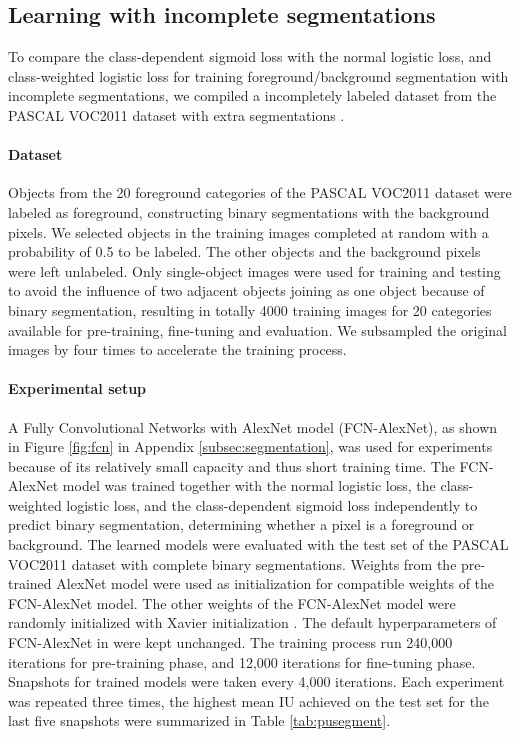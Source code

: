 \subsection{Learning with incomplete segmentations}
To compare the class-dependent sigmoid loss with the normal logistic loss, and class-weighted logistic loss for training foreground/background segmentation with incomplete segmentations, we compiled a incompletely labeled dataset from the PASCAL VOC2011 dataset \cite{everingham2015pascal} with extra segmentations \cite{hariharan2011semantic}.

\paragraph{Dataset}
Objects from the 20 foreground categories of the PASCAL VOC2011 dataset were labeled as foreground, constructing binary segmentations with the background pixels.
We selected objects in the training images completed at random with a probability of 0.5 to be labeled.
The other objects and the background pixels were left unlabeled.
Only single-object images were used for training and testing to avoid the influence of two adjacent objects joining as one object because of binary segmentation, resulting in totally 4000 training images for 20 categories available for pre-training, fine-tuning and evaluation.
We subsampled the original images by four times to accelerate the training process.


\paragraph{Experimental setup}
A Fully Convolutional Networks with AlexNet model (FCN-AlexNet), as shown in Figure \ref{fig:fcn} in Appendix \ref{subsec:segmentation}, was used for experiments because of its relatively small capacity and thus short training time.
The FCN-AlexNet model was trained together with the normal logistic loss, the class-weighted logistic loss, and the class-dependent sigmoid loss independently to predict binary segmentation, determining whether a pixel is a foreground or background.
The learned models were evaluated with the test set of the PASCAL VOC2011 dataset with complete binary segmentations.
Weights from the pre-trained AlexNet model \cite{krizhevsky2012imagenet} were used as initialization for compatible weights of the FCN-AlexNet model.
The other weights of the FCN-AlexNet model were randomly initialized with Xavier initialization \cite{glorot2010understanding}.
The default hyperparameters of FCN-AlexNet in \cite{long2015fully} were kept unchanged.
The training process run 240,000 iterations for pre-training phase, and 12,000 iterations for fine-tuning phase.
Snapshots for trained models were taken every 4,000 iterations.
Each experiment was repeated three times, the highest mean IU achieved on the test set for the last five snapshots were summarized in Table \ref{tab:pusegment}.


